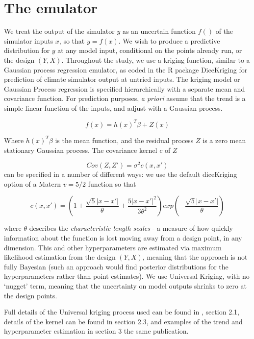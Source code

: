 \documentclass[esd, manuscript]{copernicus} %
\begin{document}
\section{The emulator}

We treat the output of the simulator $y$ as an uncertain function $f()$ of the simulator inputs $x$, so that $y = f(x)$. We wish to produce a predictive distribution for $y$ at any model input, conditional on the points already run, or the design $(Y, X)$. Throughout the study, we use a kriging function, similar to a Gaussian process regression emulator, as coded in the R package DiceKriging \citep{roustant2012dicekriging} for prediction of climate simulator output at untried inputs.
The kriging model or Gaussian Process regression is specified hierarchically with a separate mean and covariance function. For prediction purposes, \emph{a priori} assume that the trend is a simple linear function of the inputs, and adjust with a Gaussian process. 

$$
f(x) = h(x)^T \beta + Z(x)
$$

Where $h(x)^T \beta$ is the mean function, and the residual process $Z$ is a zero mean stationary Gaussian process. The covariance kernel $c$ of $Z$ 

$$
Cov(Z, Z') = \sigma^2 c(x,x')
$$
can be specified in a number of different ways: we use the default diceKriging option of a Matern $v=5/2$ function so that

$$
c(x,x') = (1 + \frac{\sqrt{5} | x - x'|}{\theta} + \frac{5 | x - x'|^2}{3 \theta^2})exp(- \frac{\sqrt{5} |x-x'|}{\theta})
$$

where $\theta$ describes the \emph{characteristic length scales} - a measure of how quickly information about the function is lost moving away from a design point, in any dimension. This and other hyperparameters are estimated via maximum likelihood estimation from the design $(Y, X)$, meaning that the approach is not fully Bayesian (such an approach would find posterior distributions for the hyperparameters rather than point estimates). We use Universal Kriging, with no `nugget' term, meaning that the uncertainty on model outputs shrinks to zero at the design points. 

Full details of the Universal kriging process used can be found in \citep{roustant2012dicekriging}, section 2.1, details of the kernel can be found in section 2.3, and examples of the trend and hyperparameter estimation  in section 3 the same publication. 
\end{document}
